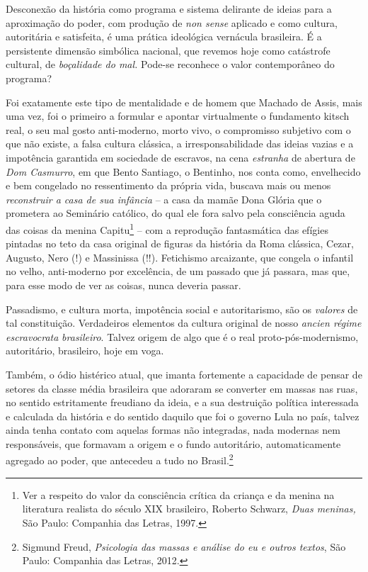 Desconexão da história como programa e sistema delirante de ideias para
a aproximação do poder, com produção de \emph{non sense} aplicado e como
cultura, autoritária e satisfeita, é uma prática ideológica vernácula
brasileira. É a persistente dimensão simbólica nacional, que revemos
hoje como catástrofe cultural, de \emph{boçalidade do mal.} Pode-se
reconhece o valor contemporâneo do programa?

Foi exatamente este tipo de mentalidade e de homem que Machado de Assis,
mais uma vez, foi o primeiro a formular e apontar virtualmente o
fundamento kitsch real, o seu mal gosto anti-moderno, morto vivo, o
compromisso subjetivo com o que não existe, a falsa cultura clássica, a
irresponsabilidade das ideias vazias e a impotência garantida em
sociedade de escravos, na cena \emph{estranha} de abertura de \emph{Dom
Casmurro}, em que Bento Santiago, o Bentinho, nos conta como,
envelhecido e bem congelado no ressentimento da própria vida, buscava
mais ou menos \emph{reconstruir a casa de sua infância} -- a casa da
mamãe Dona Glória que o prometera ao Seminário católico, do qual ele
fora salvo pela consciência aguda das coisas da menina Capitu\footnote{Ver
  a respeito do valor da consciência crítica da criança e da menina na
  literatura realista do século XIX brasileiro, Roberto Schwarz,
  \emph{Duas meninas,} São Paulo: Companhia das Letras, 1997.} -- com a
reprodução fantasmática das efígies pintadas no teto da casa original de
figuras da história da Roma clássica, Cezar, Augusto, Nero (!) e
Massinissa (!!). Fetichismo arcaizante, que congela o infantil no velho,
anti-moderno por excelência, de um passado que já passara, mas que, para
esse modo de ver as coisas, nunca deveria passar.

Passadismo, e cultura morta, impotência social e autoritarismo, são os
\emph{valores} de tal constituição. Verdadeiros elementos da cultura
original de nosso \emph{ancien régime escravocrata} \emph{brasileiro}.
Talvez origem de algo que é o real proto-pós-modernismo, autoritário,
brasileiro, hoje em voga.

Também, o ódio histérico atual, que imanta fortemente a capacidade de
pensar de setores da classe média brasileira que adoraram se converter
em massas nas ruas, no sentido estritamente freudiano da ideia, e a sua
destruição política interessada e calculada da história e do sentido
daquilo que foi o governo Lula no país, talvez ainda tenha contato com
aquelas formas não integradas, nada modernas nem responsáveis, que
formavam a origem e o fundo autoritário, automaticamente agregado ao
poder, que antecedeu a tudo no Brasil.\footnote{Sigmund Freud,
  \emph{Psicologia das massas e análise do eu e outros textos}, São
  Paulo: Companhia das Letras, 2012.}

